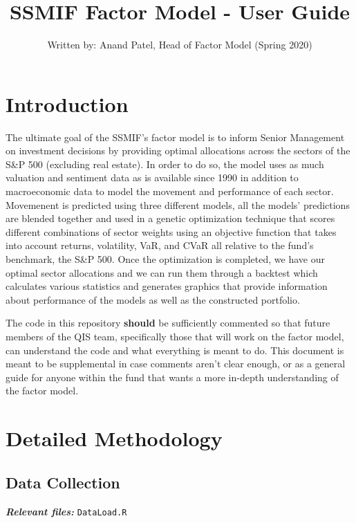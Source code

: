 \documentclass[]{article}
\title{SSMIF Factor Model - User Guide}
\author{Written by: Anand Patel, Head of Factor Model (Spring 2020)}
\date{}
\begin{document}
\maketitle

\hypertarget{introduction}{%
\section{Introduction}\label{introduction}}

The ultimate goal of the SSMIF's factor model is to inform Senior
Management on investment decisions by providing optimal allocations
across the sectors of the S\&P 500 (excluding real estate). In order to
do so, the model uses as much valuation and sentiment data as is
available since 1990 in addition to macroeconomic data to model the
movement and performance of each sector. Movemenent is predicted using
three different models, all the models' predictions are blended together
and used in a genetic optimization technique that scores different
combinations of sector weights using an objective function that takes
into account returns, volatility, VaR, and CVaR all relative to the
fund's benchmark, the S\&P 500. Once the optimization is completed, we
have our optimal sector allocations and we can run them through a
backtest which calculates various statistics and generates graphics that
provide information about performance of the models as well as the
constructed portfolio.

The code in this repository \textbf{should} be sufficiently commented so
that future members of the QIS team, specifically those that will work
on the factor model, can understand the code and what everything is
meant to do. This document is meant to be supplemental in case comments
aren't clear enough, or as a general guide for anyone within the fund
that wants a more in-depth understanding of the factor model.


\hypertarget{detailed-methodology}{%
\section{Detailed Methodology}\label{detailed-methodology}}

\hypertarget{data-collection}{%
\subsection{Data Collection}\label{data-collection}}

\textbf{\emph{Relevant files:}} \texttt{DataLoad.R}
\end{document}

